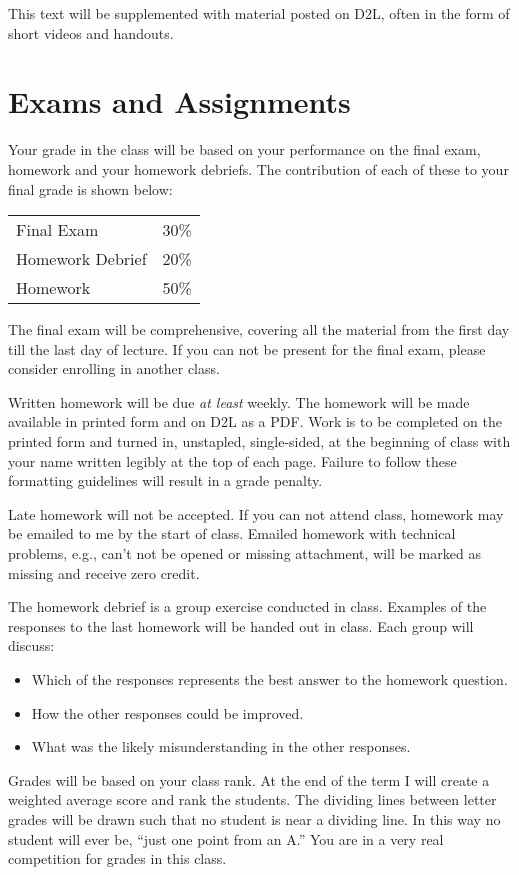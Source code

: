 \documentclass[letterpaper,10pt]{article}
\begin{document}
This text will be supplemented with material posted on D2L, often in the form of short videos and handouts.

\section{Exams and Assignments}

Your grade in the class will be based on your performance on the final
exam, homework and your homework debriefs. The contribution of each of these to your final grade is shown below:

\begin{tabular}{ll}
  Final Exam&30\%\\
  Homework Debrief&20\%\\
  Homework&50\%\\
\end{tabular} 

The final exam will be comprehensive, covering all the material from the first day till the last day of lecture. If you can not be present for the final exam, please consider enrolling in another class.

Written homework will be due \emph{at least} weekly.  The homework will be made available in printed form and on D2L as a PDF.  Work is to be completed on the printed form and turned in, unstapled, single-sided, at the beginning of class with your name written legibly at the top of each page. Failure to follow these formatting guidelines will result in a grade penalty.

Late homework will not be accepted.  If you can not attend class, homework may be emailed to me by the start of class. Emailed homework with technical problems, e.g., can't not be opened or missing attachment, will be marked as missing and receive zero credit.

The homework debrief is a group exercise conducted in class. Examples of the responses to the last homework will be handed out in class.  Each group will discuss:

\begin{itemize}
\item Which of the responses represents the best answer to the homework question.
\item How the other responses could be improved.
\item What was the likely misunderstanding in the other responses.
\end{itemize}


Grades will be based on your class rank. At the end of the term I will
create a weighted average score and rank the students. The dividing
lines between letter grades will be drawn such that no student is near
a dividing line. In this way no student will ever be, ``just one point
from an A.'' You are in a very real competition for grades in this
class. 
\end{document}
